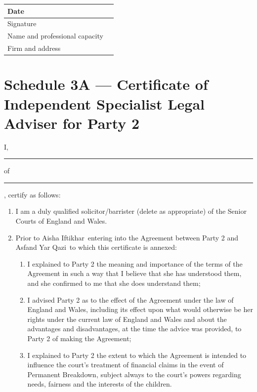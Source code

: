 \documentclass[10pt,a4paper]{article}
\newcommand{\PartyOne}{Asfand Yar Qazi}
\newcommand{\PartyTwo}{Aisha Iftikhar}
\begin{document}
\vspace{0.8em}

\begin{tabularx}{\textwidth}{|Y|Y|}
\hline
Date & \\[0.8cm]
\hline
Signature & \\[1cm]
\hline
Name and professional capacity & \\[1cm]
\hline
Firm and address & \\[1.2cm]
\hline
\end{tabularx}

\newpage
\section*{Schedule 3A --- Certificate of Independent Specialist Legal Adviser for Party 2}

\noindent I, \rule{5cm}{0.4pt} of \rule{8cm}{0.4pt}, certify as follows:

\begin{enumerate}[label=\arabic*., leftmargin=1.8em]
    \item I am a duly qualified solicitor/barrister (delete as appropriate) of the Senior Courts of England and Wales.
    \item Prior to \PartyTwo\ entering into the Agreement between Party 2 and \PartyOne\ to which this certificate is annexed:
    \begin{enumerate}[label=(\alph*), leftmargin=1.8em]
        \item I explained to Party 2 the meaning and importance of the terms of the Agreement in such a way that I believe that she has understood them, and she confirmed to me that she does understand them;
        \item I advised Party 2 as to the effect of the Agreement under the law of England and Wales, including its effect upon what would otherwise be her rights under the current law of England and Wales and about the advantages and disadvantages, at the time the advice was provided, to Party 2 of making the Agreement;
        \item I explained to Party 2 the extent to which the Agreement is intended to influence the court's treatment of financial claims in the event of Permanent Breakdown, subject always to the court's powers regarding needs, fairness and the interests of the children.
    \end{enumerate}
\end{enumerate}

\vspace{0.8em}
\end{document}
